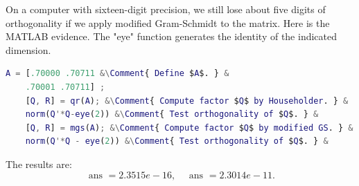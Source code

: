 On a computer with sixteen-digit precision, we still lose about five digits of orthogonality if we apply modified Gram-Schmidt to the matrix. Here is the MATLAB evidence. The "eye" function generates the identity of the indicated dimension.
\begin{lstlisting}[language=Matlab]
    A = [.70000 .70711 &\Comment{ Define $A$. } &
    .70001 .70711] ;   
    [Q, R] = qr(A); &\Comment{ Compute factor $Q$ by Householder. } &
    norm(Q'*Q-eye(2)) &\Comment{ Test orthogonality of $Q$. } &
    [Q, R] = mgs(A); &\Comment{ Compute factor $Q$ by modified GS. } &
    norm(Q'*Q - eye(2)) &\Comment{ Test orthogonality of $Q$. } &
\end{lstlisting}
The results are: 
\[
    \text { ans }=2.3515 e-16, \quad \text { ans }=2.3014 e-11. 
\]